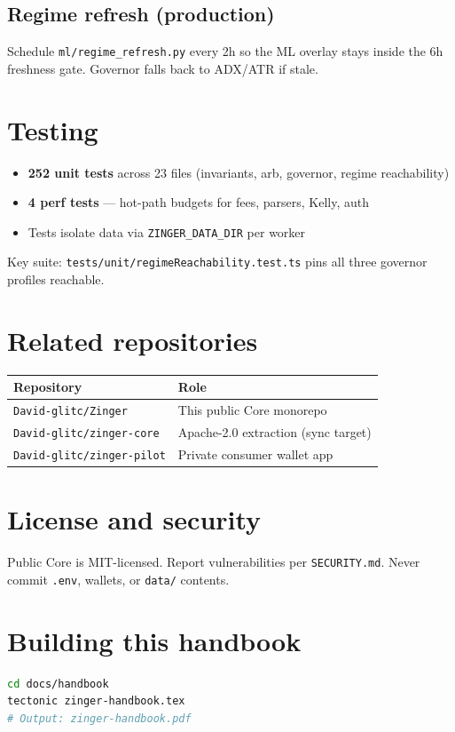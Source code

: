 \documentclass[11pt,a4paper]{report}
\begin{document}
\section{Regime refresh (production)}

Schedule \texttt{ml/regime\_refresh.py} every 2h so the ML overlay stays inside the
6h freshness gate. Governor falls back to ADX/ATR if stale.

\chapter{Testing}

\begin{itemize}[noitemsep]
  \item \textbf{252 unit tests} across 23 files (invariants, arb, governor, regime reachability)
  \item \textbf{4 perf tests} --- hot-path budgets for fees, parsers, Kelly, auth
  \item Tests isolate data via \texttt{ZINGER\_DATA\_DIR} per worker
\end{itemize}

Key suite: \texttt{tests/unit/regimeReachability.test.ts} pins all three governor profiles reachable.

\chapter{Related repositories}

\begin{longtable}{@{}ll@{}}
\toprule
Repository & Role \\
\midrule
\endhead
\texttt{David-glitc/Zinger} & This public Core monorepo \\
\texttt{David-glitc/zinger-core} & Apache-2.0 extraction (sync target) \\
\texttt{David-glitc/zinger-pilot} & Private consumer wallet app \\
\bottomrule
\end{longtable}

\appendix
\chapter{License and security}

Public Core is MIT-licensed. Report vulnerabilities per \texttt{SECURITY.md}.
Never commit \texttt{.env}, wallets, or \texttt{data/} contents.

\chapter{Building this handbook}

\begin{lstlisting}[language=bash]
cd docs/handbook
tectonic zinger-handbook.tex
# Output: zinger-handbook.pdf
\end{lstlisting}
\end{document}
